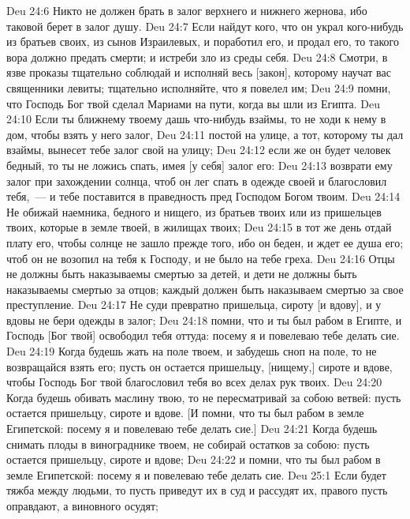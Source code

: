 \rsbpar\vs Deu 24:6 Никто не должен брать в залог верхнего и нижнего жернова, ибо таковой берет в залог душу.
\rsbpar\vs Deu 24:7 Если найдут кого, что он украл кого-нибудь из братьев своих, из сынов Израилевых, и поработил его, и продал его, то такого вора должно предать смерти; и  истреби зло из среды себя.
\rsbpar\vs Deu 24:8 Смотри, в язве проказы тщательно соблюдай и исполняй весь [закон], которому научат вас священники левиты; тщательно исполняйте, что я повелел им;
\vs Deu 24:9 помни, что Господь Бог твой сделал Мариами на пути, когда вы шли из Египта.
\rsbpar\vs Deu 24:10 Если ты ближнему твоему дашь что-нибудь взаймы, то не ходи к нему в дом, чтобы взять у него залог,
\vs Deu 24:11 постой на улице, а тот, которому ты дал взаймы, вынесет тебе залог свой на улицу;
\vs Deu 24:12 если же он будет человек бедный, то ты не ложись спать, имея [у себя] залог его:
\vs Deu 24:13 возврати ему залог при захождении солнца, чтоб он лег спать в одежде своей и благословил тебя,~--- и тебе поставится  в праведность пред Господом Богом твоим.
\vs Deu 24:14 Не обижай наемника, бедного и нищего, из братьев твоих или из пришельцев твоих, которые в земле твоей, в жилищах твоих;
\vs Deu 24:15 в тот же день отдай плату его, чтобы солнце не зашло прежде того, ибо он беден, и ждет ее душа его; чтоб он не возопил на тебя к Господу, и не было на тебе греха.
\rsbpar\vs Deu 24:16 Отцы не должны быть наказываемы смертью за детей, и дети не должны быть наказываемы смертью за отцов; каждый должен быть наказываем смертью за свое преступление.
\rsbpar\vs Deu 24:17 Не суди превратно пришельца, сироту [и вдову], и у вдовы не бери одежды в залог;
\vs Deu 24:18 помни, что и ты был рабом в Египте, и Господь [Бог твой] освободил тебя оттуда: посему я и повелеваю тебе делать сие.
\rsbpar\vs Deu 24:19 Когда будешь жать на поле твоем, и забудешь сноп на поле, то не возвращайся взять его; пусть он остается пришельцу, [нищему,] сироте и вдове, чтобы Господь Бог твой благословил тебя во всех делах рук твоих.
\vs Deu 24:20 Когда будешь обивать маслину твою, то не пересматривай за собою ветвей: пусть остается пришельцу, сироте и вдове. [И помни, что ты был рабом в земле Египетской: посему я и повелеваю тебе делать сие.]
\vs Deu 24:21 Когда будешь снимать плоды в винограднике твоем, не собирай остатков за собою: пусть остается пришельцу, сироте и вдове;
\vs Deu 24:22 и помни, что ты был рабом в земле Египетской: посему я и повелеваю тебе делать сие.
\vs Deu 25:1 Если будет тяжба между людьми, то пусть приведут их в суд и рассудят их, правого пусть оправдают, а виновного осудят;
